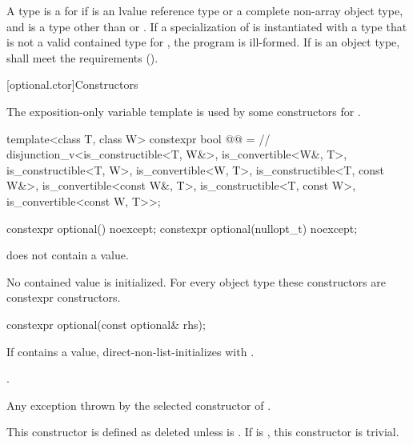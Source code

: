 \pnum
A type  is a
 for 
if  is an lvalue reference type or a complete non-array object type,
and  is a type other than  or .
If a specialization of  is instantiated with a type 
that is not a valid contained type for , the program is ill-formed.
If  is an object type,
 shall meet the  requirements ().

[optional.ctor]{Constructors}

\pnum
The exposition-only variable template 
is used by some constructors for .
\begin{codeblock}
template<class T, class W>
constexpr bool @@ =  // \expos
  disjunction_v<is_constructible<T, W&>, is_convertible<W&, T>,
                is_constructible<T, W>, is_convertible<W, T>,
                is_constructible<T, const W&>, is_convertible<const W&, T>,
                is_constructible<T, const W>, is_convertible<const W, T>>;
\end{codeblock}

%
\begin{itemdecl}
constexpr optional() noexcept;
constexpr optional(nullopt_t) noexcept;
\end{itemdecl}

\begin{itemdescr}
\pnum
\ensures
{} does not contain a value.

\pnum
\remarks
No contained value is initialized.
For every object type  these constructors are constexpr constructors.
\end{itemdescr}

%
\begin{itemdecl}
constexpr optional(const optional& rhs);
\end{itemdecl}

\begin{itemdescr}
\pnum
\effects
If  contains a value, direct-non-list-initializes 
with .

\pnum
\ensures
{}.

\pnum
\throws
Any exception thrown by the selected constructor of .

\pnum
\remarks
This constructor is defined as deleted unless
 is .
If  is ,
this constructor is trivial.
\end{itemdescr}

